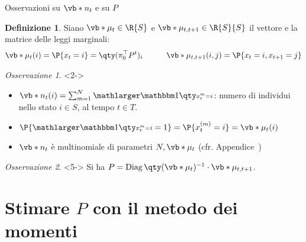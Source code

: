 \documentclass[10pt,xcolor={table,dvipsnames}]{beamer} 		%
\theoremstyle{plain}					%
\theoremstyle{definition}
\newtheorem*{definizione*}{Definizione}	%
\theoremstyle{remark}
\newtheorem*{oss*}{Osservazione}
\newcommand{\transpose}[1]{#1^{\top}}
\begin{document}
	\begin{frame}
		{\hypertarget{frame:dettagli_nt}{Osservazioni su $\vb*{n}_t$ e su $P$}}
		\begin{definizione*}
			Siano $\vb*{\mu}_t\in\R{S}$ e $\vb*{\mu}_{t,t+1}\in\R{S}{S}$ il vettore e la matrice
			delle leggi marginali:
			\vspace*{-0.5\baselineskip}
			\[\begin{aligned}
				\vb*{\mu}_t(i)=\P{x_t=i}=\qty(\transpose{\pi_0}P^t)_i & \qquad & \vb*{\mu}_{t,t+1}(i,j)=\P{x_t=i,x_{t+1}=j}\\
			\end{aligned}\]
		\end{definizione*}

		\begin{oss*}<2->
			\begin{itemize}
				\item<2-> $\vb*{n}_t(i)=\sum_{m=1}^N\indicator$: numero di individui nello stato $i\in S$,
				al tempo $t\in T$.
				\item<3-> $\P{\indicator =1}=\P{x_t^{(m)}=i}=\vb*{\mu}_t(i)$
				\item<4-> $\vb*{n}_t$ è multinomiale di parametri $N,\vb*{\mu}_t$
				(cfr. Appendice~\hyperlink{frame:dettagli_nt:appendice}{\faHandPointRight})
			\end{itemize}
		\end{oss*}

		\begin{oss*}<5->
			Si ha $P=\operatorname{Diag}\qty(\vb*{\mu}_t)^{-1}\cdot\vb*{\mu}_{t,t+1}$.

		\end{oss*}

	\end{frame}



\section{Stimare \texorpdfstring{$P$}{P} con il metodo dei momenti}
	
\end{document}
